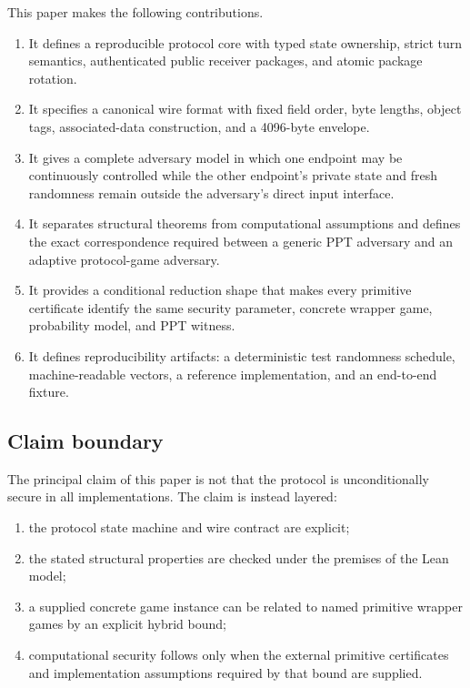 \documentclass[11pt,letterpaper]{article}
\begin{document}
This paper makes the following contributions.
\begin{enumerate}[leftmargin=*]
  \item It defines a reproducible protocol core with typed state ownership, strict turn
        semantics, authenticated public receiver packages, and atomic package rotation.
  \item It specifies a canonical wire format with fixed field order, byte lengths, object
        tags, associated-data construction, and a 4096-byte envelope.
  \item It gives a complete adversary model in which one endpoint may be continuously
        controlled while the other endpoint's private state and fresh randomness remain
        outside the adversary's direct input interface.
  \item It separates structural theorems from computational assumptions and defines the
        exact correspondence required between a generic PPT adversary and an adaptive
        protocol-game adversary.
  \item It provides a conditional reduction shape that makes every primitive certificate
        identify the same security parameter, concrete wrapper game, probability model,
        and PPT witness.
  \item It defines reproducibility artifacts: a deterministic test randomness schedule,
        machine-readable vectors, a reference implementation, and an end-to-end fixture.
\end{enumerate}

\subsection{Claim boundary}

The principal claim of this paper is not that the protocol is unconditionally secure in
all implementations. The claim is instead layered:

\begin{enumerate}[leftmargin=*]
  \item the protocol state machine and wire contract are explicit;
  \item the stated structural properties are checked under the premises of the Lean
        model;
  \item a supplied concrete game instance can be related to named primitive wrapper games
        by an explicit hybrid bound;
  \item computational security follows only when the external primitive certificates and
        implementation assumptions required by that bound are supplied.
\end{enumerate}
\end{document}
